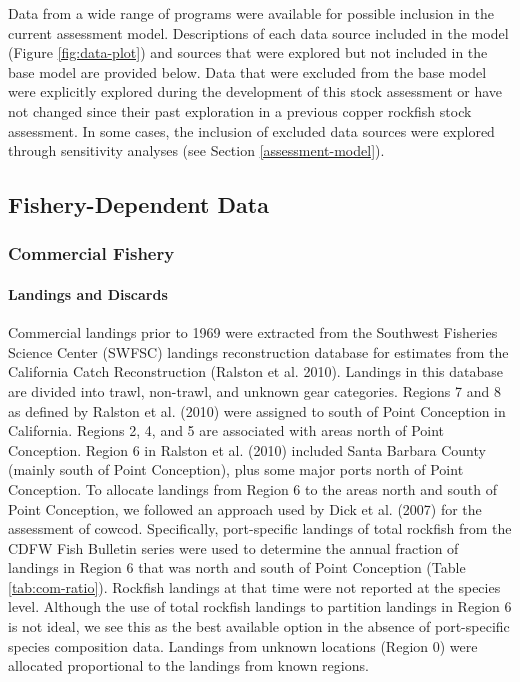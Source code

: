\documentclass[11pt,
  english,
  letterpaper,
]{article}
\begin{document}
Data from a wide range of programs were available for possible inclusion in the current assessment model. Descriptions of each data source included in the model (Figure \ref{fig:data-plot}) and sources that were explored but not included in the base model are provided below. Data that were excluded from the base model were explicitly explored during the development of this stock assessment or have not changed since their past exploration in a previous copper rockfish stock assessment. In some cases, the inclusion of excluded data sources were explored through sensitivity analyses (see Section \ref{assessment-model}).

\hypertarget{fishery-dependent-data}{%
\subsection{Fishery-Dependent Data}\label{fishery-dependent-data}}

\hypertarget{commercial-fishery}{%
\subsubsection{Commercial Fishery}\label{commercial-fishery}}

\hypertarget{landings-and-discards}{%
\paragraph{Landings and Discards}\label{landings-and-discards}}

\hfill\break

Commercial landings prior to 1969 were extracted from the Southwest Fisheries Science Center (SWFSC) landings reconstruction database for estimates from the California Catch Reconstruction (Ralston et al. 2010). Landings in this database are divided into trawl, non-trawl, and unknown gear categories. Regions 7 and 8 as defined by Ralston et al. (2010) were assigned to south of Point Conception in California. Regions 2, 4, and 5 are associated with areas north of Point Conception. Region 6 in Ralston et al. (2010) included Santa Barbara County (mainly south of Point Conception), plus some major ports north of Point Conception. To allocate landings from Region 6 to the areas north and south of Point Conception, we followed an approach used by Dick et al. (2007) for the assessment of cowcod. Specifically, port-specific landings of total rockfish from the CDFW Fish Bulletin series were used to determine the annual fraction of landings in Region 6 that was north and south of Point Conception (Table \ref{tab:com-ratio}). Rockfish landings at that time were not reported at the species level. Although the use of total rockfish landings to partition landings in Region 6 is not ideal, we see this as the best available option in the absence of port-specific species composition data. Landings from unknown locations (Region 0) were allocated proportional to the landings from known regions.
\end{document}
